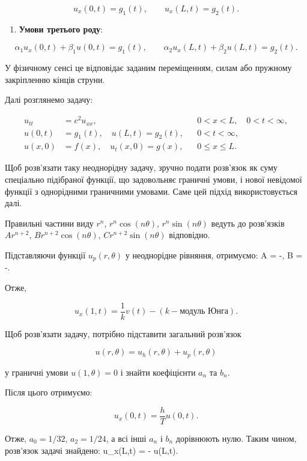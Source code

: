 \documentclass[
  ukrainian,
]{article}
\providecommand{\tightlist}{%
  \setlength{\itemsep}{0pt}\setlength{\parskip}{0pt}}
\begin{document}
\[
u_x(0,t)=g_1(t), \qquad u_x(L,t)=g_2(t).
\]

\begin{enumerate}
\def\labelenumi{\arabic{enumi}.}
\setcounter{enumi}{2}
\tightlist
\item
  \textbf{Умови третього роду}:
\end{enumerate}

\[
\alpha_1 u_x(0,t)+\beta_1 u(0,t)=g_1(t), \qquad
\alpha_2 u_x(L,t)+\beta_2 u(L,t)=g_2(t).
\]

У фізичному сенсі це відповідає заданим переміщенням, силам або пружному
закріпленню кінців струни.

Далі розглянемо задачу:

\[
\begin{aligned}
u_{tt} &= c^2u_{xx}, && 0 < x < L,\quad 0 < t < \infty, \\
u(0,t) &= g_1(t), \quad u(L,t) = g_2(t), && 0 < t < \infty, \\
u(x,0) &= f(x), \quad u_t(x,0) = g(x), && 0 \leqslant x \leqslant L.
\end{aligned}
\]

Щоб розв'язати таку неоднорідну задачу, зручно подати розв'язок як суму
спеціально підібраної функції, що задовольняє граничні умови, і нової
невідомої функції з однорідними граничними умовами. Саме цей підхід
використовується далі.

Правильні частини виду \(r^n\), \(r^n \cos(n\theta)\),
\(r^n \sin(n\theta)\) ведуть до розв'язків\\
\(Ar^{n+2}\), \(Br^{n+2} \cos(n\theta)\), \(Cr^{n+2} \sin(n\theta)\)
відповідно.

Підставляючи функції \(u_p(r,\theta)\) у неоднорідне рівняння,
отримуємо: A = -, \qquad B = -.

Отже,

\[
u_x(1,t) = \frac{1}{k} v(t) - (k - \text{модуль Юнга}).
\]

Щоб розв'язати задачу, потрібно підставити загальний розв'язок

\[
u(r,\theta)=u_h(r,\theta)+u_p(r,\theta)
\]

у граничні умови \(u(1,\theta)=0\) і знайти коефіцієнти \(a_n\) та
\(b_n\).

Після цього отримуємо:

\[
u_x(0,t) = \frac{h}{T} u(0,t).
\]

Отже, \(a_0=1/32\), \(a_2=1/24\), а всі інші \(a_n\) і \(b_n\)
дорівнюють нулю. Таким чином, розв'язок задачі знайдено: u\_x(L,t) =
- u(L,t).
\end{document}
